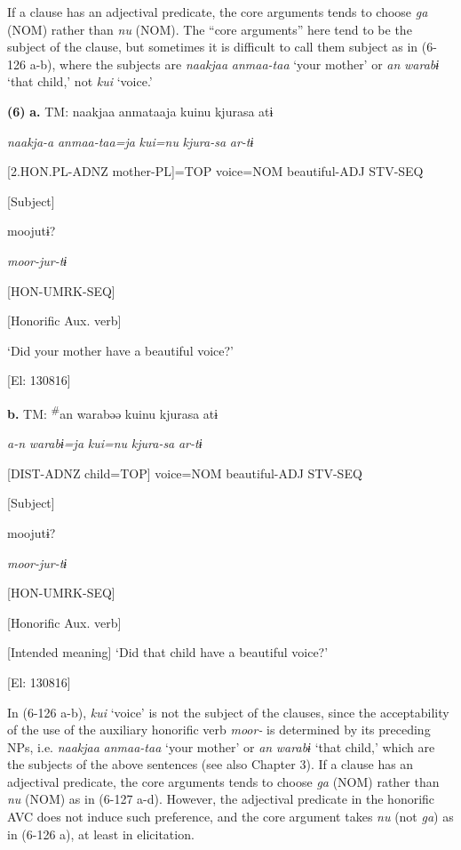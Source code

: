 If a clause has an adjectival predicate, the core arguments tends to choose \textit{ga} (NOM) rather than \textit{nu} (NOM). The “core arguments” here tend to be the subject of the clause, but sometimes it is difficult to call them subject as in (6-126 a-b), where the subjects are \textit{naakjaa} \textit{anmaa-taa} ‘your mother’ or \textit{an} \textit{warabɨ} ‘that child,’ not \textit{kui} ‘voice.’

\textbf{(6)}  \textbf{a.}  TM:  naakjaa  anmataaja  kuinu  kjurasa  atɨ

      \textit{naakja-a}  \textit{anmaa-taa=ja}  \textit{kui=nu}  \textit{kjura-sa}  \textit{ar-tɨ}

      [2.HON.PL-ADNZ  mother-PL]=TOP  voice=NOM  beautiful-ADJ  STV-SEQ

      [Subject]      

      moojutɨ?

      \textit{moor-jur-tɨ}

      [HON-UMRK-SEQ]

      [Honorific Aux. verb]

      ‘Did your mother have a beautiful voice?’

      [El: 130816]

  \textbf{b.}  TM:  \textsuperscript{\#}an  warabəə  kuinu  kjurasa  atɨ

       \textit{a-n}  \textit{warabɨ=ja}  \textit{kui=nu}  \textit{kjura-sa}  \textit{ar-tɨ}

       [DIST-ADNZ  child=TOP]  voice=NOM  beautiful-ADJ  STV-SEQ

       [Subject]      

      moojutɨ?

      \textit{moor-jur-tɨ}

      [HON-UMRK-SEQ]

      [Honorific Aux. verb]

      [Intended meaning] ‘Did that child have a beautiful voice?’

      [El: 130816]

In (6-126 a-b), \textit{kui} ‘voice’ is not the subject of the clauses, since the acceptability of the use of the auxiliary honorific verb \textit{moor-} is determined by its preceding NPs, i.e. \textit{naakjaa} \textit{anmaa-taa} ‘your mother’ or \textit{an} \textit{warabɨ} ‘that child,’ which are the subjects of the above sentences (see also Chapter 3). If a clause has an adjectival predicate, the core arguments tends to choose \textit{ga} (NOM) rather than \textit{nu} (NOM) as in (6-127 a-d). However, the adjectival predicate in the honorific AVC does not induce such preference, and the core argument takes \textit{nu} (not \textit{ga}) as in (6-126 a), at least in elicitation.


